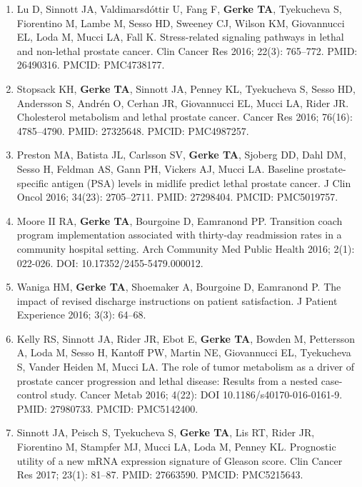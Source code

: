 \documentclass[11pt, a4paper]{article} %
\begin{document}
\begin{enumerate}[leftmargin=*]
\item{} Lu D, Sinnott JA, Valdimarsd\'{o}ttir U, Fang F, {\bf Gerke TA}, Tyekucheva S, Fiorentino M, Lambe M, Sesso HD, Sweeney CJ, Wilson KM, Giovannucci EL, Loda M, Mucci LA, Fall K. Stress-related signaling pathways in lethal and non-lethal prostate cancer. Clin Cancer Res 2016; 22(3): 765--772. PMID: 26490316. PMCID: PMC4738177. 

\item{} Stopsack KH, {\bf Gerke TA}, Sinnott JA, Penney KL, Tyekucheva S, Sesso HD, Andersson S, Andr\'{e}n O, Cerhan JR, Giovannucci EL, Mucci LA, Rider JR. Cholesterol metabolism and lethal prostate cancer. Cancer Res 2016; 76(16): 4785--4790. PMID: 27325648. PMCID: PMC4987257.

\item{} Preston MA, Batista JL, Carlsson SV, {\bf Gerke TA}, Sjoberg DD, Dahl DM, Sesso H, Feldman AS, Gann PH, Vickers AJ, Mucci LA. Baseline prostate-specific antigen (PSA) levels in midlife predict lethal prostate cancer. J Clin Oncol 2016; 34(23): 2705--2711. PMID: 27298404. PMCID: PMC5019757.

\item{} Moore II RA, {\bf Gerke TA}, Bourgoine D, Eamranond PP. Transition coach program implementation associated with thirty-day readmission rates in a community hospital setting. Arch Community Med Public Health 2016; 2(1): 022-026. DOI: 10.17352/2455-5479.000012.

\item{} Waniga HM, {\bf Gerke TA}, Shoemaker A, Bourgoine D, Eamranond P. The impact of revised discharge instructions on patient satisfaction. J Patient Experience 2016; 3(3): 64--68. 

\item{} Kelly RS, Sinnott JA, Rider JR, Ebot E, {\bf Gerke TA}, Bowden M, Pettersson A, Loda M, Sesso H, Kantoff PW, Martin NE, Giovannucci EL, Tyekucheva S, Vander Heiden M, Mucci LA. The role of tumor metabolism as a driver of prostate cancer progression and lethal disease: Results from a nested case-control study. Cancer Metab 2016; 4(22): DOI 10.1186/s40170-016-0161-9. PMID: 27980733. PMCID: PMC5142400.

\item{} Sinnott JA, Peisch S, Tyekucheva S, {\bf Gerke TA}, Lis RT, Rider JR, Fiorentino M, Stampfer MJ, Mucci LA, Loda M, Penney KL. Prognostic utility of a new mRNA expression signature of Gleason score. Clin Cancer Res 2017; 23(1): 81--87. PMID: 27663590. PMCID: PMC5215643. 


\end{enumerate}
\end{document}
